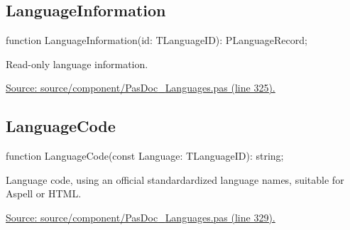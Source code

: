 \documentclass{report}
\newif\ifpdf
\begin{document}
\subsection*{LanguageInformation}
\fi
\label{PasDoc_Languages-LanguageInformation}
\begin{list}{}{
\setlength{\itemindent}{0cm}
\setlength{\listparindent}{0cm}
\setlength{\leftmargin}{\evensidemargin}
\addtolength{\leftmargin}{\tmplength}
\settowidth{\labelsep}{X}
\addtolength{\leftmargin}{\labelsep}
\setlength{\labelwidth}{\tmplength}
}
\item[\textbf{Declaration}\hfill]
\ifpdf
\begin{flushleft}
\fi
\begin{ttfamily}
function LanguageInformation(id: TLanguageID): PLanguageRecord;\end{ttfamily}

\ifpdf
\end{flushleft}
\fi

\par
\item[\textbf{Description}]
Read{-}only language information.\par
\href{https://github.com/pasdoc/pasdoc/blob/master/source/component/PasDoc_Languages.pas#L325}{Source: source/component/PasDoc{\_}Languages.pas (line 325).}

\end{list}
\ifpdf
\subsection*{\large{\textbf{LanguageCode}}\normalsize\hspace{1ex}\hrulefill}
\else
\subsection*{LanguageCode}
\fi
\label{PasDoc_Languages-LanguageCode}
\begin{list}{}{
\setlength{\itemindent}{0cm}
\setlength{\listparindent}{0cm}
\setlength{\leftmargin}{\evensidemargin}
\addtolength{\leftmargin}{\tmplength}
\settowidth{\labelsep}{X}
\addtolength{\leftmargin}{\labelsep}
\setlength{\labelwidth}{\tmplength}
}
\item[\textbf{Declaration}\hfill]
\ifpdf
\begin{flushleft}
\fi
\begin{ttfamily}
function LanguageCode(const Language: TLanguageID): string;\end{ttfamily}

\ifpdf
\end{flushleft}
\fi

\par
\item[\textbf{Description}]
Language code, using an official standardardized language names, suitable for Aspell or HTML.\par
\href{https://github.com/pasdoc/pasdoc/blob/master/source/component/PasDoc_Languages.pas#L329}{Source: source/component/PasDoc{\_}Languages.pas (line 329).}

\end{list}
\end{document}
